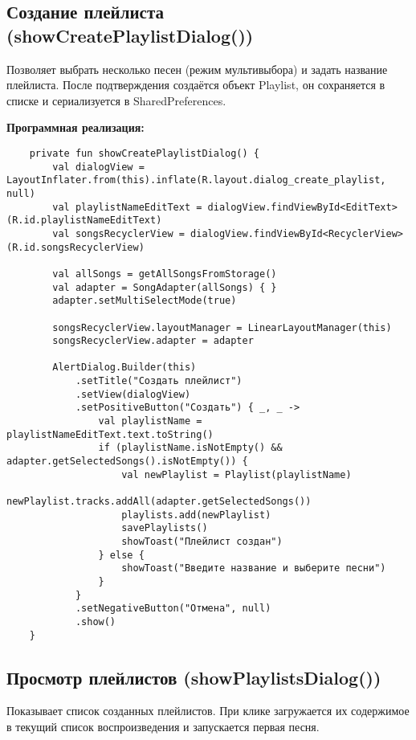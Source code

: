 \subsection{Создание плейлиста (showCreatePlaylistDialog())}

Позволяет выбрать несколько песен (режим мультивыбора) и задать название плейлиста. После подтверждения создаётся объект Playlist, он сохраняется в списке и сериализуется в SharedPreferences.

\textbf{Программная реализация:}
\begin{verbatim}
	private fun showCreatePlaylistDialog() {
        val dialogView = LayoutInflater.from(this).inflate(R.layout.dialog_create_playlist, null)
        val playlistNameEditText = dialogView.findViewById<EditText>(R.id.playlistNameEditText)
        val songsRecyclerView = dialogView.findViewById<RecyclerView>(R.id.songsRecyclerView)

        val allSongs = getAllSongsFromStorage()
        val adapter = SongAdapter(allSongs) { }
        adapter.setMultiSelectMode(true)

        songsRecyclerView.layoutManager = LinearLayoutManager(this)
        songsRecyclerView.adapter = adapter

        AlertDialog.Builder(this)
            .setTitle("Создать плейлист")
            .setView(dialogView)
            .setPositiveButton("Создать") { _, _ ->
                val playlistName = playlistNameEditText.text.toString()
                if (playlistName.isNotEmpty() && adapter.getSelectedSongs().isNotEmpty()) {
                    val newPlaylist = Playlist(playlistName)
                    newPlaylist.tracks.addAll(adapter.getSelectedSongs())
                    playlists.add(newPlaylist)
                    savePlaylists()
                    showToast("Плейлист создан")
                } else {
                    showToast("Введите название и выберите песни")
                }
            }
            .setNegativeButton("Отмена", null)
            .show()
    }
\end{verbatim}

\subsection{Просмотр плейлистов (showPlaylistsDialog())}

Показывает список созданных плейлистов. При клике загружается их содержимое в текущий список воспроизведения и запускается первая песня.

